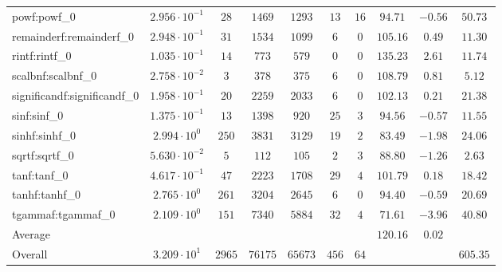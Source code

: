 \begin{tabular}{|l|c|c|c|c|c|c|c|c|c|}
powf:powf\_0                 & $ 2.956 \cdot 10^{-1} $ & $ 28     $ & $ 1469  $ & $ 1293  $ & $ 13  $ & $ 16 $ & $ 94.71       $ & $ -0.56   $ & $ 50.73   $ \\
remainderf:remainderf\_0     & $ 2.948 \cdot 10^{-1} $ & $ 31     $ & $ 1534  $ & $ 1099  $ & $ 6   $ & $ 0  $ & $ 105.16      $ & $ 0.49    $ & $ 11.30   $ \\
rintf:rintf\_0               & $ 1.035 \cdot 10^{-1} $ & $ 14     $ & $ 773   $ & $ 579   $ & $ 0   $ & $ 0  $ & $ 135.23      $ & $ 2.61    $ & $ 11.74   $ \\
scalbnf:scalbnf\_0           & $ 2.758 \cdot 10^{-2} $ & $ 3      $ & $ 378   $ & $ 375   $ & $ 6   $ & $ 0  $ & $ 108.79      $ & $ 0.81    $ & $ 5.12    $ \\
significandf:significandf\_0 & $ 1.958 \cdot 10^{-1} $ & $ 20     $ & $ 2259  $ & $ 2033  $ & $ 6   $ & $ 0  $ & $ 102.13      $ & $ 0.21    $ & $ 21.38   $ \\
sinf:sinf\_0                 & $ 1.375 \cdot 10^{-1} $ & $ 13     $ & $ 1398  $ & $ 920   $ & $ 25  $ & $ 3  $ & $ 94.56       $ & $ -0.57   $ & $ 11.55   $ \\
sinhf:sinhf\_0               & $ 2.994 \cdot 10^{0}  $ & $ 250    $ & $ 3831  $ & $ 3129  $ & $ 19  $ & $ 2  $ & $ 83.49       $ & $ -1.98   $ & $ 24.06   $ \\
sqrtf:sqrtf\_0               & $ 5.630 \cdot 10^{-2} $ & $ 5      $ & $ 112   $ & $ 105   $ & $ 2   $ & $ 3  $ & $ 88.80       $ & $ -1.26   $ & $ 2.63    $ \\
tanf:tanf\_0                 & $ 4.617 \cdot 10^{-1} $ & $ 47     $ & $ 2223  $ & $ 1708  $ & $ 29  $ & $ 4  $ & $ 101.79      $ & $ 0.18    $ & $ 18.42   $ \\
tanhf:tanhf\_0               & $ 2.765 \cdot 10^{0}  $ & $ 261    $ & $ 3204  $ & $ 2645  $ & $ 6   $ & $ 0  $ & $ 94.40       $ & $ -0.59   $ & $ 20.69   $ \\
tgammaf:tgammaf\_0           & $ 2.109 \cdot 10^{0}  $ & $ 151    $ & $ 7340  $ & $ 5884  $ & $ 32  $ & $ 4  $ & $ 71.61       $ & $ -3.96   $ & $ 40.80   $ \\
\hline
Average                      & $                     $ & $        $ & $       $ & $       $ & $     $ & $    $ & $ 120.16      $ & $ 0.02    $ & $         $ \\
\hline
Overall                      & $ 3.209 \cdot 10^{1}  $ & $ 2965   $ & $ 76175 $ & $ 65673 $ & $ 456 $ & $ 64 $ & $             $ & $         $ & $ 605.35  $ \\
\hline
\end{tabular}
